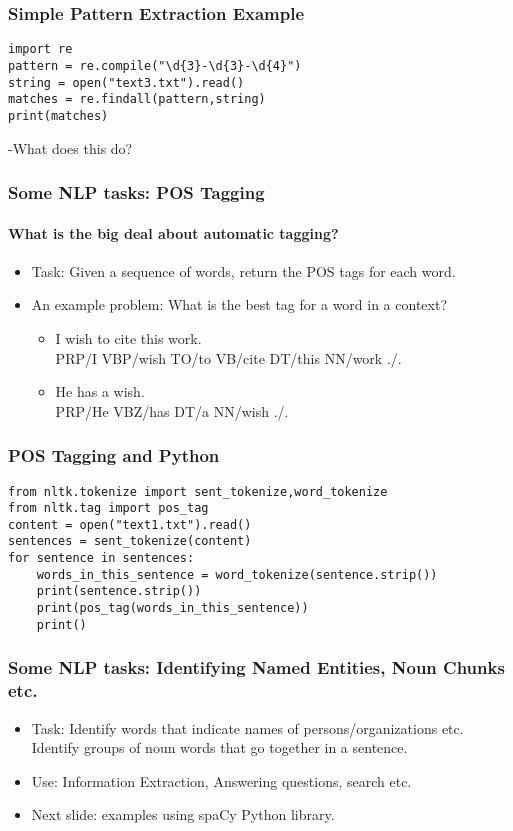 \documentclass{beamer}
\begin{document}
\begin{frame}[fragile]
\frametitle{Simple Pattern Extraction Example}
\small
\begin{verbatim}
import re
pattern = re.compile("\d{3}-\d{3}-\d{4}")
string = open("text3.txt").read()
matches = re.findall(pattern,string)
print(matches)
\end{verbatim}
-What does this do?
\end{frame}

\begin{frame}
\frametitle{Some NLP tasks: POS Tagging}
\framesubtitle{What is the big deal about automatic tagging?}
\begin{itemize}
\item Task: Given a sequence of words, return the POS tags for each word.
\item An example problem: What is the best tag for a word in a context?
\begin{itemize}
\item I wish to cite this work. 
\\ PRP/I  VBP/wish  TO/to  VB/cite  DT/this  NN/work ./.
\item He has a wish.
\\ PRP/He  VBZ/has  DT/a  NN/wish ./. 
\end{itemize}
\end{itemize}
\end{frame}

\begin{frame}[fragile]
\small
\frametitle{POS Tagging and Python}
\begin{verbatim}
from nltk.tokenize import sent_tokenize,word_tokenize
from nltk.tag import pos_tag
content = open("text1.txt").read()
sentences = sent_tokenize(content)
for sentence in sentences:
    words_in_this_sentence = word_tokenize(sentence.strip())
    print(sentence.strip())
    print(pos_tag(words_in_this_sentence))
    print()
\end{verbatim}
\end{frame}

\begin{frame}
\frametitle{Some NLP tasks: Identifying Named Entities, Noun Chunks etc.}
\begin{itemize}
\item Task: Identify words that indicate names of persons/organizations etc. Identify groups of noun words that go together in a sentence. 
\item Use: Information Extraction, Answering questions, search etc.
\item Next slide: examples using spaCy Python library. 
\end{itemize}
\end{frame}
\end{document}
